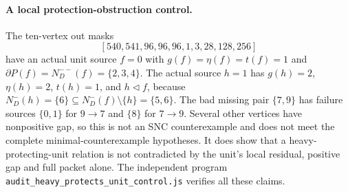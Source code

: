 \paragraph{A local protection-obstruction control.}
The ten-vertex out masks
\[
 [540,541,96,96,96,1,3,28,128,256]
\]
have an actual unit source $f=0$ with
$g(f)=\eta(f)=t(f)=1$ and
$\partial P(f)=N_D^{--}(f)=\{2,3,4\}$.
The actual source $h=1$ has $g(h)=2$, $\eta(h)=2$, $t(h)=1$, and
$h\triangleleft f$, because
$N_D^-(h)=\{6\}\subseteq N_D^-(f)\setminus\{h\}=\{5,6\}$.
The bad missing pair $\{7,9\}$ has failure sources $\{0,1\}$ for
$9\to7$ and $\{8\}$ for $7\to9$. Several other vertices have
nonpositive gap, so this is not an SNC counterexample and does not
meet the complete minimal-counterexample hypotheses. It does show
that a heavy-protecting-unit relation is not contradicted by the unit's
local residual, positive gap and full packet alone.
The independent program
\texttt{audit\_heavy\_protects\_unit\_control.js} verifies all these claims.
